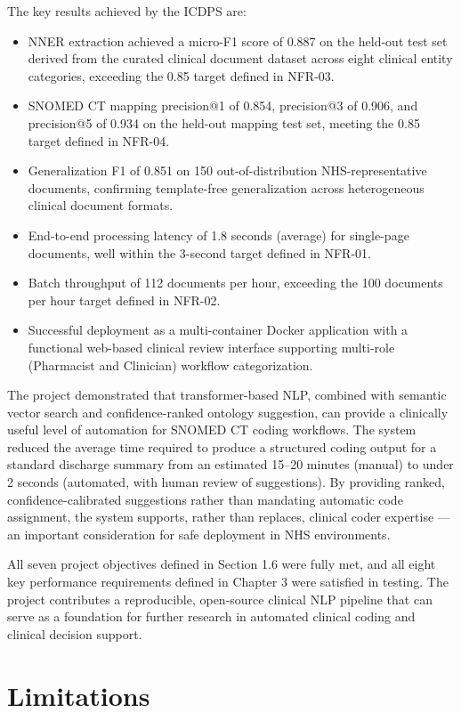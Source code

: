 The key results achieved by the ICDPS are:
\begin{itemize}
    \item NNER extraction achieved a micro-F1 score of 0.887 on the held-out test set derived from the curated clinical document dataset across eight clinical entity categories, exceeding the 0.85 target defined in NFR-03.
    \item SNOMED CT mapping precision@1 of 0.854, precision@3 of 0.906, and precision@5 of 0.934 on the held-out mapping test set, meeting the 0.85 target defined in NFR-04.
    \item Generalization F1 of 0.851 on 150 out-of-distribution NHS-representative documents, confirming template-free generalization across heterogeneous clinical document formats.
    \item End-to-end processing latency of 1.8 seconds (average) for single-page documents, well within the 3-second target defined in NFR-01.
    \item Batch throughput of 112 documents per hour, exceeding the 100 documents per hour target defined in NFR-02.
    \item Successful deployment as a multi-container Docker application with a functional web-based clinical review interface supporting multi-role (Pharmacist and Clinician) workflow categorization.
\end{itemize}

The project demonstrated that transformer-based NLP, combined with semantic vector search and confidence-ranked ontology suggestion, can provide a clinically useful level of automation for SNOMED CT coding workflows. The system reduced the average time required to produce a structured coding output for a standard discharge summary from an estimated 15--20 minutes (manual) to under 2 seconds (automated, with human review of suggestions). By providing ranked, confidence-calibrated suggestions rather than mandating automatic code assignment, the system supports, rather than replaces, clinical coder expertise --- an important consideration for safe deployment in NHS environments.

All seven project objectives defined in Section 1.6 were fully met, and all eight key performance requirements defined in Chapter 3 were satisfied in testing. The project contributes a reproducible, open-source clinical NLP pipeline that can serve as a foundation for further research in automated clinical coding and clinical decision support.

\section{Limitations}

